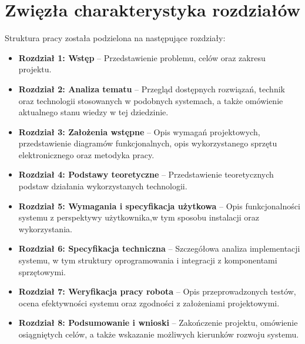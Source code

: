 \section{Zwięzła charakterystyka rozdziałów}
\label{sec:charakterystyka}

Struktura pracy została podzielona na następujące rozdziały:

\begin{itemize}
    \item \textbf{Rozdział 1: Wstęp} – Przedstawienie problemu, celów oraz zakresu projektu.
    \item \textbf{Rozdział 2: Analiza tematu} – Przegląd dostępnych rozwiązań, technik oraz technologii stosowanych w podobnych systemach, a także omówienie aktualnego stanu wiedzy w tej dziedzinie.
    \item \textbf{Rozdział 3: Założenia wstępne} – Opis wymagań projektowych, przedstawienie diagramów funkcjonalnych, opis wykorzystanego sprzętu elektronicznego oraz metodyka pracy. 
    \item \textbf{Rozdział 4: Podstawy teoretyczne} – Przedstawienie teoretycznych podstaw działania wykorzystanych technologii. 
    \item \textbf{Rozdział 5: Wymagania i specyfikacja użytkowa} – Opis funkcjonalności systemu z perspektywy użytkownika,w tym sposobu instalacji oraz wykorzystania. 
    \item \textbf{Rozdział 6: Specyfikacja techniczna} – Szczegółowa analiza implementacji systemu, w tym struktury oprogramowania i integracji z komponentami sprzętowymi.
    \item \textbf{Rozdział 7: Weryfikacja pracy robota} – Opis przeprowadzonych testów, ocena efektywności systemu oraz zgodności z założeniami projektowymi.
    \item \textbf{Rozdział 8: Podsumowanie i wnioski} – Zakończenie projektu, omówienie osiągniętych celów, a także wskazanie możliwych kierunków rozwoju systemu.
\end{itemize}


